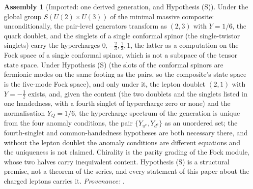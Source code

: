 \documentclass[11pt]{article}
\theoremstyle{definition}
\newtheorem{assembled}[theorem]{Assembly}
\theoremstyle{plain}
\newcommand{\changedmark}[2]{\marginpar{\raggedright\scriptsize\color{#1}#2}}
\begin{document}
\begin{assembled}[Imported: one derived generation, and Hypothesis (S)]\label{c:families.imported-one-derived-generation-hypothesis-s}
\changedmark{gray}{reworded}
Under the global group $S(U(2) \times U(3))$ of the minimal massive composite: unconditionally, the pair-level generators transform as $(2,3)$ with $Y = 1/6$, the quark doublet, and the singlets of a single conformal spinor (the single-twistor singlets) carry the hypercharges $0, -\tfrac23, \tfrac13, 1$, the latter as a computation on the Fock space of a single conformal spinor, which is not a subspace of the tensor state space. Under Hypothesis (S) (the slots of the conformal spinors are fermionic modes on the same footing as the pairs, so the composite's state space is the five-mode Fock space), and only under it, the lepton doublet $(2,1)$ with $Y = -\tfrac12$ exists, and, given the content (the two doublets and the singlets listed in one handedness, with a fourth singlet of hypercharge zero or none) and the normalisation $Y_{Q} = 1/6$, the hypercharge spectrum of the generation is unique from the four anomaly conditions, the pair $\{Y_{u^{c}}, Y_{d^{c}}\}$ as an unordered set; the fourth-singlet and common-handedness hypotheses are both necessary there, and without the lepton doublet the anomaly conditions are different equations and the uniqueness is not claimed. Chirality is the parity grading of the Fock module, whose two halves carry inequivalent content. Hypothesis (S) is a structural premise, not a theorem of the series, and every statement of this paper about the charged leptons carries it. \emph{Provenance:} \cite[\S4-\S5, in particular Prop.~5.3, Thm.~5.5, Prop.~5.6]{ButlerT12}.
\end{assembled}
\end{document}
